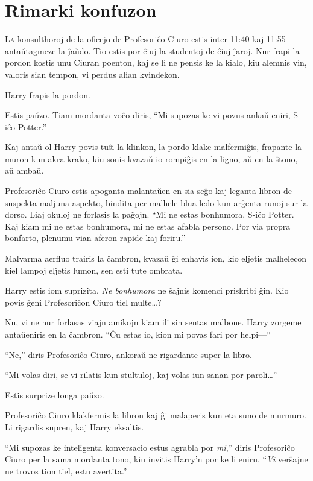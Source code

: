 \chapter{Rimarki konfuzon}

\lettrine{L}{a} konsulthoroj de la oficejo de Profesoriĉo Ciuro estis
inter 11:40 kaj 11:55 antaŭtagmeze la ĵaŭdo. Tio estis por ĉiuj la
studentoj de ĉiuj ĵaroj. Nur frapi la pordon kostis unu Ciuran
poenton, kaj se li ne pensis ke la kialo, kiu alemnis vin, valoris
sian tempon, vi perdus alian kvindekon.

Harry frapis la pordon.

Estis paŭzo. Tiam mordanta voĉo diris, ``Mi supozas ke vi povus ankaŭ
eniri, S-iĉo Potter.''

Kaj antaŭ ol Harry povis tuŝi la klinkon, la pordo klake malfermiĝis,
frapante la muron kun akra krako, kiu sonis kvazaŭ io rompiĝis en la
ligno, aŭ en la ŝtono, aŭ ambaŭ.

Profesoriĉo Ciuro estis apoganta malantaŭen en sia seĝo kaj leganta
libron de suspekta maljuna aspekto, bindita per malhele blua ledo kun
arĝenta runoj sur la dorso. Liaj okuloj ne forlasis la paĝojn. ``Mi ne
estas bonhumora, S-iĉo Potter. Kaj kiam mi ne estas bonhumora, mi ne
estas afabla persono. Por via propra bonfarto, plenumu vian aferon
rapide kaj foriru.''

Malvarma aerfluo trairis la ĉambron, kvazaŭ ĝi enhavis ion, kio elĵetis
malhelecon kiel lampoj elĵetis lumon, sen esti tute ombrata.

Harry estis iom suprizita. \emph{Ne bonhumora} ne ŝajnis komenci
priskribi ĝin. Kio povis ĝeni Profesoriĉon Ciuro tiel multe\ldots{}?

Nu, vi ne nur forlasas viajn amikojn kiam ili sin sentas
malbone. Harry zorgeme antaŭeniris en la ĉambron. ``Ĉu estas io, kion
mi povas fari por helpi—''

``Ne,'' diris Profesoriĉo Ciuro, ankoraŭ ne rigardante super la libro.

``Mi volas diri, se vi rilatis kun stultuloj, kaj volas iun sanan por
paroli\ldots{}''

Estis surprize longa paŭzo.

Profesoriĉo Ciuro klakfermis la libron kaj ĝi malaperis kun eta suno
de murmuro. Li rigardis supren, kaj Harry eksaltis.

``Mi supozas ke inteligenta konversacio estus agrabla por \emph{mi},''
diris Profesoriĉo Ciuro per la sama mordanta tono, kiu invitis Harry'n
por ke li eniru. ``\emph{Vi} verŝajne ne trovos tion tiel, estu
avertita.''

